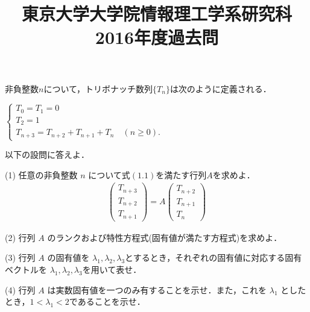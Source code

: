 \documentclass[a4j]{jarticle}
\title{東京大学大学院情報理工学系研究科2016年度過去問}
\author{}
\date{}
\let \ds \displaystyle
\begin{document}
\thispagestyle{empty}
\maketitle
\pagebreak


\section{}

\begin{screen}
 非負整数$n$について，トリボナッチ数列$\{T_n\}$は次のように定義される．
 
 $\ds \begin{cases} T_0 = T_1 = 0 \\ T_2 = 1 \\ T_{n+3} = T_{n+2} + T_{n+1} + T_{n} \quad(n \geq 0).\end{cases}$

 以下の設問に答えよ．
\end{screen}

\begin{screen}
 (1) 任意の非負整数 $n$ について式$(1.1)$を満たす行列$A$を求めよ．
 \begin{align*}
  \left(\begin{array}{l}T_{n+3} \\ T_{n+2} \\T_{n+1}\end{array}\right)
  =A\left(\begin{array}{l}T_{n+2} \\ T_{n+1} \\T_{n}\end{array}\right)\tag{1.1}
 \end{align*}
\end{screen}

\begin{screen}
 (2) 行列 $A$ のランクおよび特性方程式(固有値が満たす方程式)を求めよ．
\end{screen}


\begin{screen}
 (3) 行列 $A$ の固有値を $\lambda_1,\lambda_2,\lambda_3$とするとき，それぞれの固有値に対応する固有ベクトルを $\lambda_1,\lambda_2,\lambda_3$を用いて表せ．
\end{screen}


\begin{screen}
 (4) 行列 $A$ は実数固有値を一つのみ有することを示せ．また，これを $\lambda_1$ としたとき，$1<\lambda_1<2$であることを示せ．
\end{screen}
\end{document}
